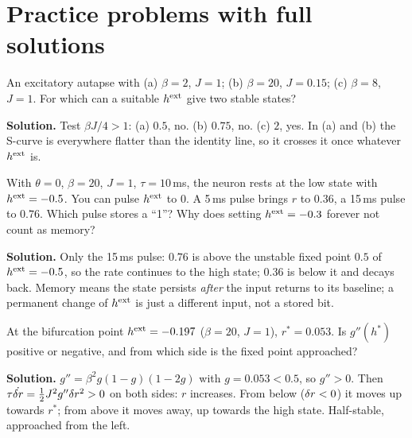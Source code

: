 
\section{Practice problems with full solutions}

\begin{example}
An excitatory autapse with (a) $\beta=2$, $J=1$; (b) $\beta=20$, $J=0.15$; (c) $\beta=8$, $J=1$. For which can a suitable $h^{\text{ext}}$ give two stable states?

\textbf{Solution.} Test $\beta J/4>1$: (a) $0.5$, no. (b) $0.75$, no. (c) $2$, yes. In (a) and (b) the S-curve is everywhere flatter than the identity line, so it crosses it once whatever $h^{\text{ext}}$ is.
\end{example}

\begin{example}
With $\theta=0$, $\beta=20$, $J=1$, $\tau=10$\,ms, the neuron rests at the low state with $h^{\text{ext}}=-0.5$. You can pulse $h^{\text{ext}}$ to $0$. A 5\,ms pulse brings $r$ to $0.36$, a 15\,ms pulse to $0.76$. Which pulse stores a ``1''? Why does setting $h^{\text{ext}}=-0.3$ forever not count as memory?

\textbf{Solution.} Only the 15\,ms pulse: $0.76$ is above the unstable fixed point $0.5$ of $h^{\text{ext}}=-0.5$, so the rate continues to the high state; $0.36$ is below it and decays back. Memory means the state persists \emph{after} the input returns to its baseline;
a permanent change of $h^{\text{ext}}$ is just a different input, not a stored bit.
\end{example}

\begin{example}
At the bifurcation point $h^{\text{ext}}=-0.197$ ($\beta=20$, $J=1$), $r^*=0.053$. Is $g''(h^*)$ positive or negative, and from which side is the fixed point approached?

\textbf{Solution.} $g''=\beta^2g(1-g)(1-2g)$ with $g=0.053<0.5$, so $g''>0$. Then $\tau\dot{\delta r} = \tfrac12J^2g''\delta r^2>0$ on both sides: $r$ increases. From below ($\delta r<0$) it moves up towards $r^*$; from above it moves away, up towards the high state.
Half-stable, approached from the left.
\end{example}

